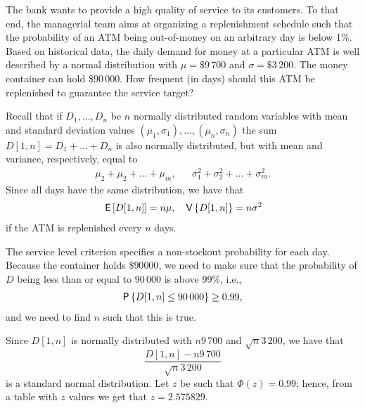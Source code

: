 \begin{exercise}[Continuation]
The bank wants to provide a high quality of service to its customers. To that end, the managerial team aims at organizing a replenishment schedule such that the probability of an ATM being out-of-money on an arbitrary day is below 1\%. Based on  historical data,  the daily demand for money at a particular ATM is well described by a normal distribution with $\mu=\$9\,700$ and $\sigma=\$3\,200$. The money container can hold \$90\,000. How frequent (in days) should this ATM be replenished to guarantee the service target?
\begin{solution}
  
Recall that if $D_1,\ldots,D_n$ be $n$ normally distributed random variables with mean and standard deviation values $(\mu_1,\sigma_1),\ldots,(\mu_n,\sigma_n)$ the sum $D[1,n]=D_1+\ldots+D_n$ is also normally distributed, but with mean and variance, respectively, equal to
\begin{align*}
\mu_2+\mu_2+\ldots+\mu_m, & &\sigma_1^2+\sigma_2^2+\ldots+\sigma_m^2.
\end{align*}
Since all days have the same distribution, we have that 
\begin{align*}
  \,\mathsf{E}\left[D[1,n]\right] &= n \mu, & \,\mathsf{V}\left\{D[1,n]\right\} = n \sigma^2
\end{align*}
if the ATM is replenished every $n$ days. 

The service level criterion specifies a non-stockout probability for each day. Because the container holds $\$90 000$, we need to make sure that the probability of $D$ being less than or equal to $90\,000$ is above 99\%, i.e., 
\begin{align*}
  \P{D[1,n] \leq 90\,000} \geq 0.99,
\end{align*}
and we need to find $n$ such that this is true.  


Since $D[1,n]$ is normally distributed with $n 9\,700$ and $\sqrt{n}3\,200$, we have that
\begin{equation*}
  \frac{D[1,n]-n9\,700}{\sqrt{n} 3\,200}
\end{equation*}
is a standard normal distribution. Let $z$ be such that $\Phi(z) = 0.99$; hence, from a table with $z$ values we get that $z = 2.575829$.


\end{solution}
\end{exercise}
